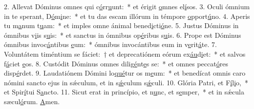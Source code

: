 2. Allevat Dóminus omnes qui c\uline{ó}rr\uline{u}unt:~* et érigit \uline{o}mnes el\uline{í}sos.
3. Oculi ómnium in te sperant, D\uline{ó}m\uline{i}ne:~* et tu das escam illórum in témpore \uline{o}pport\uline{ú}no.
4. Aperis tu m\uline{a}num t\uline{u}am:~* et imples omne ánimal bened\uline{i}cti\uline{ó}ne.
5. Justus Dóminus in ómnibus v\uline{i}is s\uline{u}is:~* et sanctus in ómnibus op\uline{é}ribus s\uline{u}is.
6. Prope est Dóminus ómnibus invoc\uline{á}ntibus \uline{e}um:~* ómnibus invocántibus eum in v\uline{e}rit\uline{á}te.
7. Voluntátem timéntium se fáciet:~† et deprecatiónem eórum ex\uline{áu}d\uline{i}et:~* et salvos f\uline{á}ciet \uline{e}os.
8. Custódit Dóminus omnes dilig\uline{é}nt\uline{e}s se:~* et omnes peccat\uline{ó}res disp\uline{é}rdet.
9. Laudatiónem Dómini lo\uline{qué}tur os m\uline{e}um:~* et benedícat omnis caro nómini sancto ejus in sǽculum, et in s\uline{ǽ}culum s\uline{ǽ}culi.
10. Glória Patri, et F\uline{í}l\uline{i}o,~* et Spir\uline{í}tui S\uline{a}ncto.
11. Sicut erat in princípio, et n\uline{u}nc, et s\uline{e}mper,~* et in sǽcula sæcul\uline{ó}rum. \uline{A}men.
